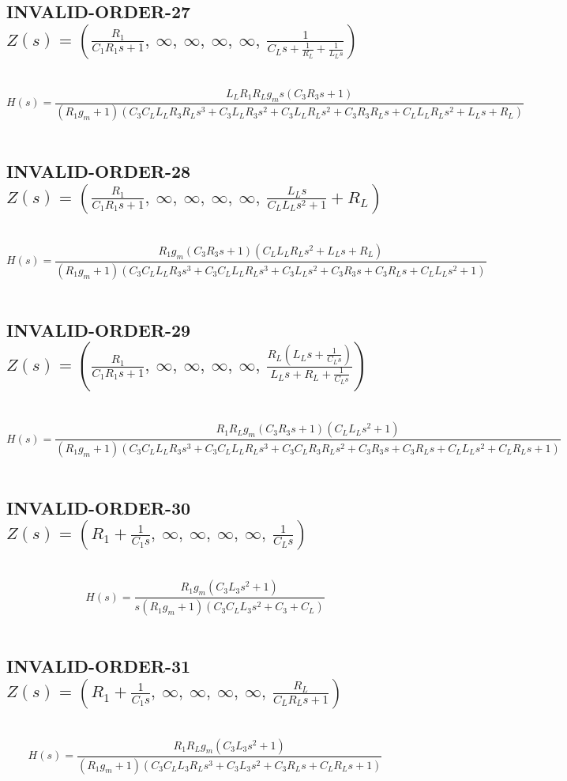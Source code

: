 \documentclass{article}
\begin{document}
\subsection{INVALID-ORDER-27 $Z(s) = \left( \frac{R_{1}}{C_{1} R_{1} s + 1}, \  \infty, \  \infty, \  \infty, \  \infty, \  \frac{1}{C_{L} s + \frac{1}{R_{L}} + \frac{1}{L_{L} s}}\right)$ } \ 
\textbf{\[H(s) = \frac{L_{L} R_{1} R_{L} g_{m} s \left(C_{3} R_{3} s + 1\right)}{\left(R_{1} g_{m} + 1\right) \left(C_{3} C_{L} L_{L} R_{3} R_{L} s^{3} + C_{3} L_{L} R_{3} s^{2} + C_{3} L_{L} R_{L} s^{2} + C_{3} R_{3} R_{L} s + C_{L} L_{L} R_{L} s^{2} + L_{L} s + R_{L}\right)}\] } \ 
\subsection{INVALID-ORDER-28 $Z(s) = \left( \frac{R_{1}}{C_{1} R_{1} s + 1}, \  \infty, \  \infty, \  \infty, \  \infty, \  \frac{L_{L} s}{C_{L} L_{L} s^{2} + 1} + R_{L}\right)$ } \ 
\textbf{\[H(s) = \frac{R_{1} g_{m} \left(C_{3} R_{3} s + 1\right) \left(C_{L} L_{L} R_{L} s^{2} + L_{L} s + R_{L}\right)}{\left(R_{1} g_{m} + 1\right) \left(C_{3} C_{L} L_{L} R_{3} s^{3} + C_{3} C_{L} L_{L} R_{L} s^{3} + C_{3} L_{L} s^{2} + C_{3} R_{3} s + C_{3} R_{L} s + C_{L} L_{L} s^{2} + 1\right)}\] } \ 
\subsection{INVALID-ORDER-29 $Z(s) = \left( \frac{R_{1}}{C_{1} R_{1} s + 1}, \  \infty, \  \infty, \  \infty, \  \infty, \  \frac{R_{L} \left(L_{L} s + \frac{1}{C_{L} s}\right)}{L_{L} s + R_{L} + \frac{1}{C_{L} s}}\right)$ } \ 
\textbf{\[H(s) = \frac{R_{1} R_{L} g_{m} \left(C_{3} R_{3} s + 1\right) \left(C_{L} L_{L} s^{2} + 1\right)}{\left(R_{1} g_{m} + 1\right) \left(C_{3} C_{L} L_{L} R_{3} s^{3} + C_{3} C_{L} L_{L} R_{L} s^{3} + C_{3} C_{L} R_{3} R_{L} s^{2} + C_{3} R_{3} s + C_{3} R_{L} s + C_{L} L_{L} s^{2} + C_{L} R_{L} s + 1\right)}\] } \ 
\subsection{INVALID-ORDER-30 $Z(s) = \left( R_{1} + \frac{1}{C_{1} s}, \  \infty, \  \infty, \  \infty, \  \infty, \  \frac{1}{C_{L} s}\right)$ } \ 
\textbf{\[H(s) = \frac{R_{1} g_{m} \left(C_{3} L_{3} s^{2} + 1\right)}{s \left(R_{1} g_{m} + 1\right) \left(C_{3} C_{L} L_{3} s^{2} + C_{3} + C_{L}\right)}\] } \ 
\subsection{INVALID-ORDER-31 $Z(s) = \left( R_{1} + \frac{1}{C_{1} s}, \  \infty, \  \infty, \  \infty, \  \infty, \  \frac{R_{L}}{C_{L} R_{L} s + 1}\right)$ } \ 
\textbf{\[H(s) = \frac{R_{1} R_{L} g_{m} \left(C_{3} L_{3} s^{2} + 1\right)}{\left(R_{1} g_{m} + 1\right) \left(C_{3} C_{L} L_{3} R_{L} s^{3} + C_{3} L_{3} s^{2} + C_{3} R_{L} s + C_{L} R_{L} s + 1\right)}\] } \ 
\end{document}
